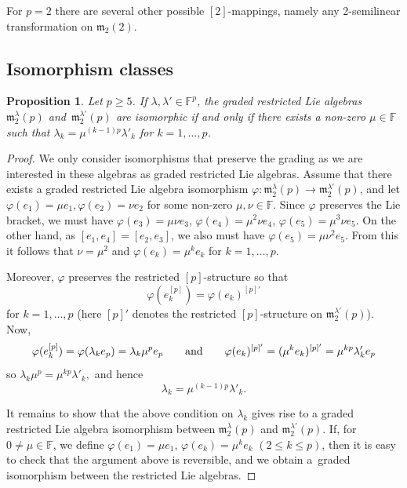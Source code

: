 \documentclass[10pt,a4paper]{amsart}
\def\phi{\varphi}
\def\m{\mathfrak m}
\def\F{\mathbb F}
\numberwithin{equation}{section}
\newtheorem{Proposition}[Theorem]{Proposition}
 { \theoremstyle{definition}
\newtheorem{Remark}[Theorem]{Remark} }
\begin{document}
\begin{Remark} For $p=2$ there are several other possible $[2]$-mappings, namely any 2-semilinear transformation on $\m_2(2)$.
\end{Remark}

\subsection{Isomorphism classes}

\begin{Proposition} Let $p\geq 5$. If $\lambda,\lambda'\in\F^p$, the graded restricted Lie algebras~$\m_2^{\lambda}(p)$ and~$\m_2^{\lambda'}(p)$ are isomorphic if and only if there exists a non-zero $\mu\in\F$ such that $\lambda_k=\mu^{(k-1)p}\lambda'_k$ for $k=1,\dots,p$.
\end{Proposition}

\begin{proof} We only consider isomorphisms that preserve the grading as we are
 interested in these algebras as graded restricted Lie
 algebras. Assume that there exists a graded restricted Lie algebra
 isomorphism $\phi\colon \m_2^{\lambda}(p) \to \m_2^{\lambda'}(p)$, and
 let $\phi(e_1)=\mu e_1, \phi(e_2)=\nu e_2$ for some non-zero
 $\mu, \nu \in \F$. Since $\phi$ preserves the Lie bracket, we must
 have $\phi(e_3)=\mu\nu e_3$, $\phi(e_4)=\mu^2\nu e_4$,
 $\phi(e_5)=\mu^3\nu e_5$. On the other hand, as
 $[e_1, e_4] = [e_2,e_3]$, we also must have
 $\phi(e_5)=\mu\nu^2 e_5$. From this it follows that $\nu=\mu^2$ and
 $\phi(e_k)=\mu^k e_k$ for $k=1,\dots, p$.

 Moreover, $\phi$ preserves the restricted $[p]$-structure so that
 \[
 \phi(e_k^{[p]})=\phi(e_k)^{[p]'}
 \]
 for $k=1,\dots, p$ (here $[p]'$ denotes the restricted $[p]$-structure on
 $\m_2^{\lambda'}(p)$). Now,
 \[
 \phi(e_k^{[p]})=\phi(\lambda_k e_p)=\lambda_k\mu^p e_p\qquad {\rm and}\qquad \phi(e_k)^{[p]'}=(\mu^k e_k)^{[p]'}=\mu^{kp}\lambda_k' e_p
 \]
 so $\lambda_k\mu^p=\mu^{kp}\lambda'_k,$ and hence
 \[
 \lambda_k=\mu^{(k-1)p}\lambda'_k.
 \]

It remains to show that the above condition on $\lambda_k$ gives rise to a graded restricted Lie algebra isomorphism between $\m_2^{\lambda}(p)$ and $\m_2^{\lambda'}(p)$. If, for $0\ne \mu\in\F$, we define $\phi(e_1)=\mu e_1$, $\phi(e_k)=\mu^k e_k$ $(2\le k\le p)$, then it is easy to check that the argument above is reversible, and we obtain a~graded isomorphism between the restricted Lie algebras.
\end{proof}
\end{document}

